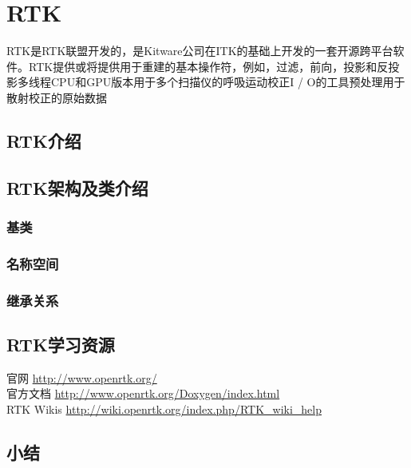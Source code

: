 

\chapter{RTK}
RTK\cite{rit2014reconstruction}是RTK联盟开发的，是Kitware公司在ITK的基础上开发的一套开源跨平台软件。RTK提供或将提供用于重建的基本操作符，例如，过滤，前向，投影和反投影多线程CPU和GPU版本用于多个扫描仪的呼吸运动校正I / O的工具预处理用于散射校正的原始数据
\section{RTK介绍}

\section{RTK架构及类介绍}
\subsection{}
\subsection{基类}
\subsection{名称空间}
\subsection{继承关系}


\section{RTK学习资源}
官网 \textcolor{blue}{\url{http://www.openrtk.org/}}\\
官方文档 \textcolor{blue}{\url{http://www.openrtk.org/Doxygen/index.html}}\\
RTK Wikis \textcolor{blue}{\url{http://wiki.openrtk.org/index.php/RTK_wiki_help}}

\section{小结}


